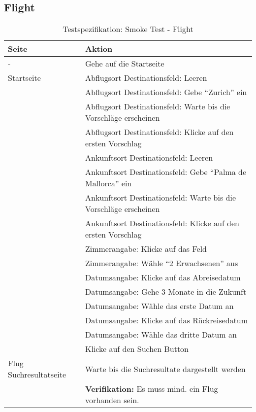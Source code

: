 \subsection{Flight}
\begin{table}[H] 
	\caption{Testspezifikation: Smoke Test - Flight}
	\centering
		
	\begin{tabularx}{0.9\textwidth}{ | l | X | } 
		\hline 
		\textbf{Seite} & \textbf{Aktion} \\ \hline 
		\multirow{1}{*}{-} & Gehe auf die Startseite \\ \hline
		\multirow{1}{*}{Startseite} & Abflugsort Destinationsfeld: Leeren \\ \cline{2-2}
		& Abflugsort Destinationsfeld: Gebe "`Zurich"' ein \\ \cline{2-2}
		& Abflugsort Destinationsfeld: Warte bis die Vorschläge erscheinen \\ \cline{2-2}
		& Abflugsort Destinationsfeld: Klicke auf den ersten Vorschlag \\ \cline{2-2}
		& Ankunftsort Destinationsfeld: Leeren \\ \cline{2-2}
		& Ankunftsort Destinationsfeld: Gebe "`Palma de Mallorca"' ein \\ \cline{2-2}
		& Ankunftsort Destinationsfeld: Warte bis die Vorschläge erscheinen \\ \cline{2-2}
		& Ankunftsort Destinationsfeld: Klicke auf den ersten Vorschlag \\ \cline{2-2}
		& Zimmerangabe: Klicke auf das Feld \\ \cline{2-2}
		& Zimmerangabe: Wähle "`2 Erwachsenen"' aus \\ \cline{2-2}
		& Datumsangabe: Klicke auf das Abreisedatum \\ \cline{2-2}
		& Datumsangabe: Gehe 3 Monate in die Zukunft \\ \cline{2-2}
		& Datumsangabe: Wähle das erste Datum an \\ \cline{2-2}
		& Datumsangabe: Klicke auf das Rückreisedatum \\ \cline{2-2}
		& Datumsangabe: Wähle das dritte Datum an \\ \cline{2-2}
		& Klicke auf den Suchen Button \\ \hline
				
		\multirow{1}{*}{Flug Suchresultatseite} & Warte bis die Suchresultate dargestellt werden \\ \cline{2-2}
		& \textbf{Verifikation:} Es muss mind. ein Flug vorhanden sein. \\ \hline
	\end{tabularx} 
\end{table}

